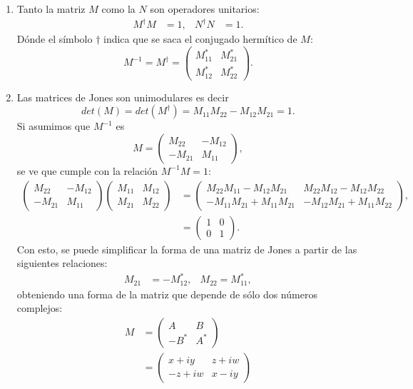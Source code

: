 \begin{enumerate}
\item Tanto la matriz $M$ como la $N$ son operadores unitarios:
  \begin{align*}
    M^{\dagger} M &= 1,& N^{\dagger}N &=1.
  \end{align*}
Dónde el símbolo $\dagger$ indica que se saca el conjugado hermítico
de $M$:
\begin{equation*}
M^{-1}=M^{\dagger}=
  \begin{pmatrix}
      M_{11}^*&M_{21}^*\\M_{12}^* & M_{22}^*
    \end{pmatrix}.
\end{equation*}
\item Las matrices de Jones son unimodulares es decir
\begin{equation}det(M) = det(M^{\dagger})  = M_{11}M_{22}-M_{12}M_{21} = 1.\label{eq:unimodular}\end{equation} 
Si asumimos que $M^{-1}$ es
\begin{equation*}
  M=
  \begin{pmatrix}
    M_{22}&-M_{12}\\-M_{21}&M_{11}
  \end{pmatrix},
\end{equation*}
se ve que cumple con la relación $M^{-1}M = 1$:
\begin{align*}
    \begin{pmatrix}
    M_{22}&-M_{12}\\-M_{21}&M_{11}
  \end{pmatrix}
\begin{pmatrix}
      M_{11}&M_{12}\\M_{21} & M_{22}
    \end{pmatrix}
&=
    \begin{pmatrix}
 M_{22}M_{11}-M_{12}M_{21}     & M_{22}M_{12}-M_{12}M_{22}\\
-M_{11}M_{21}+M_{11}M_{21}    & -M_{12}M_{21} + M_{11}M_{22} 
    \end{pmatrix},\\
&=
\begin{pmatrix}
  1 &0\\0&1
\end{pmatrix}.
\end{align*}
Con esto, se puede simplificar la forma de una matriz de Jones a
partir de las siguientes relaciones:
\begin{align*}
  M_{21} &= - M_{12}^*, & M_{22} = M_{11}^*,
\end{align*}
obteniendo una forma de la matriz que depende de sólo dos números
complejos:
\begin{align}
  M&=
  \begin{pmatrix}
    A & B \\-B^* & A^*
  \end{pmatrix}\\
&=
  \begin{pmatrix}
    x+iy & z+iw \\-z+iw & x-iy
  \end{pmatrix}
\label{eq:general_jones_matrix}
\end{align}


\end{enumerate}
